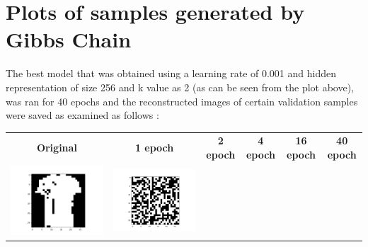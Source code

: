 \documentclass[12pt]{report}
\begin{document}
\section{Plots of samples generated by Gibbs Chain}
The best model that was obtained using a learning rate of 0.001 and hidden representation of size 256 and k value as 2 (as can be seen from the plot above), was ran for 40 epochs and the reconstructed images of certain validation samples were saved as examined as follows :

\begin{table}[H]
  \centering
  \begin{tabular}{  c  c  c  c  c  c }
    \textbf{Original} & \textbf{1 epoch} & \textbf{2 epoch} & \textbf{4 epoch} & \textbf{16 epoch}  & \textbf{40 epoch} \\ 
    \begin{minipage}{.15\textwidth}
      \includegraphics[scale=0.2]{BM_avisual.png}
    \end{minipage} & 
    \begin{minipage}{.15\textwidth}
      \includegraphics[scale=0.2]{BM_a1.png}

\end{minipage}
\end{tabular}
\end{table}
\end{document}
